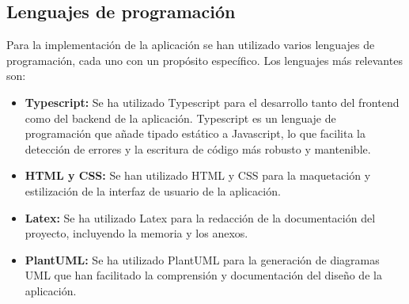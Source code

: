 \subsection{Lenguajes de programación}
Para la implementación de la aplicación se han utilizado varios lenguajes de programación, cada uno con un propósito específico. Los lenguajes más relevantes son:
\begin {itemize}
\item {\bfseries Typescript:} Se ha utilizado Typescript para el desarrollo tanto del frontend como del backend de la aplicación. Typescript es un lenguaje de programación que añade tipado estático a Javascript, lo que facilita la detección de errores y la escritura de código más robusto y mantenible.
\item {\bfseries HTML y CSS:} Se han utilizado HTML y CSS para la maquetación y estilización de la interfaz de usuario de la aplicación.
\item {\bfseries Latex:} Se ha utilizado Latex para la redacción de la documentación del proyecto, incluyendo la memoria y los anexos.
\item {\bfseries PlantUML:} Se ha utilizado PlantUML para la generación de diagramas UML que han facilitado la comprensión y documentación del diseño de la aplicación.
\end {itemize}


